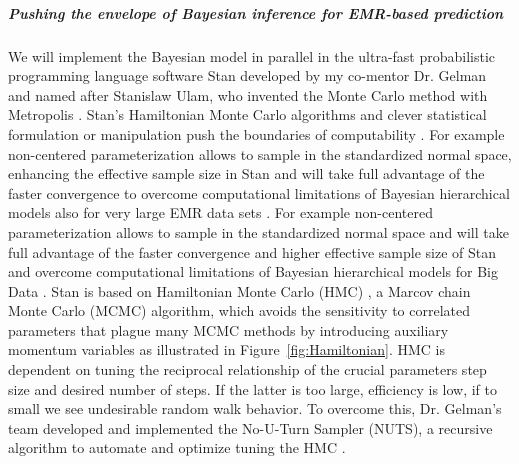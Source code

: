 \documentclass[11pt,notitlepage]{article}
\begin{document}
\subparagraph{Pushing the envelope of Bayesian inference for EMR-based prediction}
We will implement the Bayesian model in parallel in the ultra-fast probabilistic programming language software Stan developed by my co-mentor Dr. Gelman \cite{Stan_Software_2014} and named after Stanislaw
Ulam, who invented the Monte Carlo method with Metropolis \cite{StanislawUlam_1949}. Stan's Hamiltonian Monte Carlo algorithms \cite{Stan_Software_2014} and clever statistical formulation or manipulation push the boundaries of computability \cite{Gelman-Hill_2014}. For example non-centered parameterization allows to sample in the standardized normal space, enhancing the effective sample size in Stan and will take full advantage of the faster convergence to overcome computational limitations of Bayesian hierarchical models also for very large EMR data sets \cite{Gelman-Hill_2014}. For example non-centered parameterization allows to sample in the standardized normal space and will take full advantage of the faster convergence and higher effective sample size of Stan and overcome computational limitations of Bayesian hierarchical models for Big Data \cite{Gelman-Hill_2014}. Stan  is based on Hamiltonian Monte Carlo (HMC) \cite{Gelman-Hill_2014}, a Marcov chain Monte Carlo (MCMC) algorithm, which avoids the sensitivity to correlated parameters that plague many MCMC methods by introducing auxiliary momentum variables \cite{Homan_Gelman_NUTS_2014} as illustrated in Figure~\ref{fig:Hamiltonian}. HMC is dependent  on tuning the reciprocal relationship of the crucial parameters step size and desired number of steps. If the latter is too large, efficiency is low, if to small we see undesirable random walk behavior. To overcome this, Dr. Gelman's team developed and implemented the No-U-Turn Sampler (NUTS), a recursive algorithm to automate and optimize tuning the HMC \cite{Homan_Gelman_NUTS_2014}.
  
\end{document}
